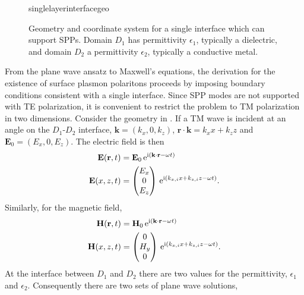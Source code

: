 \begin{figure}[ht]
 \centering
 {singlelayerinterfacegeo}
	\caption{Geometry and coordinate system for a single interface which can
support SPPs.  Domain $D_1$ has permittivity $\epsilon_1$, typically a
dielectric, and domain $D_2$ a permittivity $\epsilon_2$, typically a
conductive metal.}
\label{fig:singleinterfacegeo}
\end{figure}

From the plane wave ansatz to Maxwell's equations, the 
derivation for the existence of surface plasmon polaritons proceeds 
by imposing boundary conditions consistent with a single
interface.  Since SPP modes are not supported with TE polarization, it is
convenient to restrict the problem to TM polarization in two dimensions.
Consider the geometry in .  If
a TM wave is incident at an angle on the $D_1$-$D_2$ interface,
$\mathbf{k}=(k_x,0,k_z)$,
$\mathbf{r}\cdot\mathbf{k}=k_x x + k_z z$ and $\mathbf{E}_0 = (E_x, 0,
E_z)$. The electric field is then
\begin{align}
\mathbf{E} ( \mathbf{r}, t ) &= \mathbf{E}_0\, {\mathrm{e}}^{{\mathrm{i}} (\mathbf{k}
\cdot \mathbf{r} - \omega t )}\\
\mathbf{E}(x,z,t)&=\begin{pmatrix}
E_x\\ 0\\ E_z
\end{pmatrix}
\, {\mathrm{e}}^{{\mathrm{i}}(k_{x,i}x+k_{z,i}z-\omega t)}.
\label{eqn:planewavexz}
\end{align}
Similarly, for the magnetic field,
\begin{align}
\mathbf{H} ( \mathbf{r}, t ) &= \mathbf{H}_0\, {\mathrm{e}}^{{\mathrm{i}} (\mathbf{k}
\cdot \mathbf{r} - \omega t )}\\
\mathbf{H}(x,z,t)&=\begin{pmatrix}
0\\ H_y\\ 0
\end{pmatrix}
\, {\mathrm{e}}^{{\mathrm{i}}(k_{x,i}x+k_{z,i}z-\omega t)}.
\end{align}
At the interface between $D_1$ and $D_2$ there are two values for the permittivity,
$\epsilon_1$ and $\epsilon_2$.  Consequently there are two sets of plane
wave solutions,
